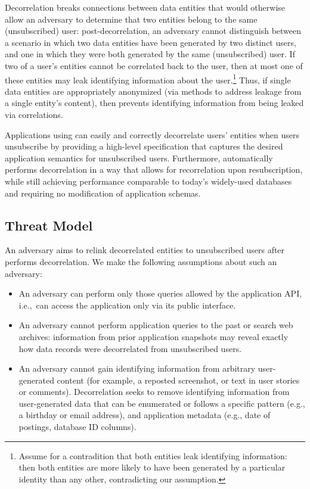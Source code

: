 Decorrelation breaks connections between data entities that would otherwise allow an adversary to
determine that two entities belong to the same (unsubscribed) user: post-decorrelation, an adversary
cannot distinguish between a scenario in which two data entities have been generated by two distinct
users, and one in which they were both generated by the same (unsubscribed) user.  If two of a
user's entities cannot be correlated back to the user, then at most one of these entities may leak
identifying information about the user.\footnote{Assume for a contradition that both entities leak
identifying information: then both entities are more likely to have been generated by a particular
identity than any other, contradicting our assumption.}  Thus, if single data entities are
appropriately anonymized (via methods to address leakage from a single entity's content), then
\sys{} prevents identifying information from being leaked via correlations.

Applications using \sys{} can easily and correctly decorrelate users' entities when users
unsubscribe by providing a high-level specification that captures the desired application semantics
for unsubscribed users. Furthermore, \sys{} automatically performs decorrelation in a way that
allows for recorrelation upon resubscription, while still achieving performance comparable to
today’s widely-used databases and requiring no modification of application schemas. 

\subsection{Threat Model} 
An adversary aims to relink decorrelated entities to unsubscribed users after \sys{}
performs decorrelation. We make the following assumptions about such an adversary: 
\begin{itemize}
    \item An adversary can perform only those queries allowed by the application API, 
i.e.,\ can access the application only via its public interface. 

    \item An adversary cannot perform application queries to the past or search web archives:
    information from prior application snapshots may reveal 
    exactly how data records were decorrelated from unsubscribed users. 

    \item An adversary cannot gain identifying information from arbitrary user-generated content (for
        example, a reposted screenshot, or text in user stories or comments). Decorrelation seeks to
        remove identifying information from user-generated data that can be enumerated or follows a
        specific pattern (e.g., a birthday or email address), and application metadata (e.g., date
        of postings, database ID columns).
\end{itemize}

